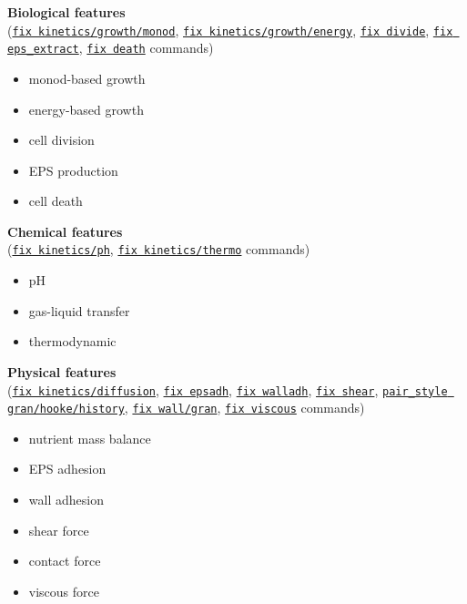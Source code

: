 \documentclass[11pt,a4paper,openright]{article}
\begin{document}
\noindent\textbf{Biological features}\\
\noindent(\hyperref[fkineticsmonod]{\tt fix kinetics/growth/monod}, 
\hyperref[fkineticsenergy]{\tt fix kinetics/growth/energy}, 
\hyperref[divide]{\tt fix divide}, 
\hyperref[epsextract]{\tt fix eps\_extract}, 
\hyperref[death]{\tt fix death} commands)\\

\begin{itemize} [nosep]
\item monod-based growth
\item energy-based growth
\item cell division
\item EPS production
\item cell death \\
\end{itemize} 

\noindent\textbf{Chemical features} \\
\noindent(\hyperref[fkineticsph]{\tt fix kinetics/ph}, 
\hyperref[fkineticsthermo]{\tt fix kinetics/thermo} commands)\\
\begin{itemize} [nosep]
\item pH
\item gas-liquid transfer
\item thermodynamic \\
\end{itemize} 

\noindent\textbf{Physical features}\\
\noindent(\hyperref[fkineticsdiffusion]{\tt fix kinetics/diffusion}, 
\hyperref[epsadh]{\tt fix epsadh}, 
\hyperref[walladh]{\tt fix walladh}, 
\hyperref[shear]{\tt fix shear}, 
\href{http://lammps.sandia.gov/doc/pair_gran.html}{\tt pair\_style gran/hooke/history}, 
\href{http://lammps.sandia.gov/doc/fix_wall_gran.html}{\tt fix wall/gran}, 
\href{http://lammps.sandia.gov/doc/fix_viscous.html}{\tt fix viscous} commands)\\
\begin{itemize} [nosep]
\item nutrient mass balance
\item EPS adhesion
\item wall adhesion
\item shear force
\item contact force
\item viscous force \\
\end{itemize} 
\end{document}
